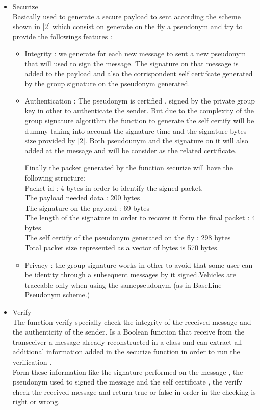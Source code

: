\begin{itemize}

\item Securize\\
Basically used to generate a secure payload to sent according the scheme shown in [2] which consist on generate on the fly a pseudonym and try to provide the followings features :
\begin{itemize}
\item Integrity : we generate for each new message  to sent a new pseudonym that will used to sign the message. The signature on that message is added to the payload and also the corrispondent self certifcate generated by the group signature on the pseudonym generated. 
\item Authentication : The pseudonym  is  certified , signed by the private group key in other to authenticate the sender. But due to the complexity of the group signature algorithm the function to generate the self certify will be dummy taking into account the signature time and the signature bytes size provided by [2]. Both pseudounym  and the signature on it will also added at the message and will be consider as the related certificate.

Finally the packet generated by the function securize will have the following structure:\\
    Packet id : 4 bytes in order to identify the signed packet.\\
    The payload needed data : 200 bytes \\
    The signature on the payload : 69 bytes\\
    The length of the signature in order to recover it form the final packet : 4 bytes\\
    The self certify of the pseudonym generated on the fly : 298 bytes\\
  Total packet size represented as a vector of bytes is 570 bytes.\\
\item Privacy : the group signature works in other to avoid that some user can be identity through a subsequent messages by it signed.Vehicles are traceable only when using the samepseudonym (as in BaseLine Pseudonym scheme.) 
\end{itemize}

\item Verify\\
The function verify specially check the integrity of the received message and the authenticity of the sender.
Is a Boolean function that receive from the transceiver a message already reconstructed in a class and can extract all additional  information added in the securize  function in order to run the verification .\\
Form these information like the signature performed on the message , the pseudonym  used to signed the message and the self certificate , the verify check  the received message and return true or false in order in the checking is right or wrong.


\end{itemize}
